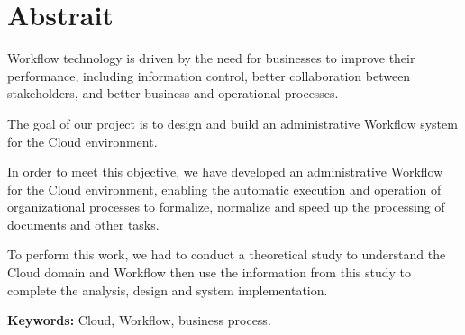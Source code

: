 \chapter*{Abstrait}
\large
Workflow technology is driven by the need for businesses to improve their performance, including information control, better collaboration between stakeholders, and better business and operational processes.

The goal of our project is to design and build an administrative Workflow system for the Cloud environment.


In order to meet this objective, we have developed an administrative Workflow for the Cloud environment, enabling the automatic execution and operation of organizational processes to formalize, normalize and speed up the processing of documents and other tasks.

To perform this work, we had to conduct a theoretical study to understand the Cloud domain and Workflow then use the information from this study to complete the analysis, design and system implementation.


\textbf{Keywords:} Cloud, Workflow, business process.
 
 \normalsize